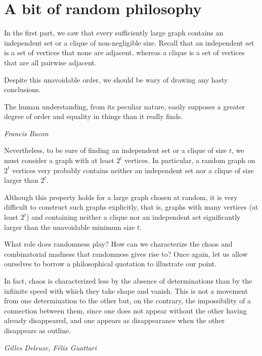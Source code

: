 \documentclass{amsart}
\begin{document}
\section{A bit of random philosophy}
In the first part, we saw that every sufficiently large graph contains
an independent set or a clique of non-negligible size. Recall that an
independent set is a set of vertices that  none are adjacent,
whereas a clique is a set of vertices that are all pairwise adjacent.

Despite this unavoidable order, we should be wary of drawing any hasty
conclusions.

\bigskip\par
\begin{quoting}\sf\noindent
  The human understanding, from its peculiar nature, easily supposes
  a greater degree of order and equality in things than it really
  finds.
  \medskip\par\noindent\it Francis Bacon%
\end{quoting}
\bigskip\par

Nevertheless, to be sure of finding an independent set or a clique of
size $t$, we must consider a graph with at least $2^{t}$ vertices. In
particular, a random graph%
on $2^{t}$ vertices very probably%
contains neither an independent set nor a clique of size larger than
$2^{t}$.

Although this property holds for a large graph chosen at random, it is
very difficult to construct such graphs explicitly, that is, graphs
with many vertices (at least $2^{t}$) and containing neither a clique nor an
independent set significantly larger than the unavoidable minimum size
$t$.

What role does randomness play? How can we characterize the chaos and
combinatorial madness that randomness gives rise to? Once again, let
us allow ourselves to borrow a philosophical quotation to illustrate
our point.

\bigskip\par
\begin{quoting}\sf\noindent
  In fact, chaos is characterized less by the absence of
  determinations than by the infiinite speed with which they take
  shape and vanish. This is not a movement from one determination to
  the other but, on the contrary, the impossibility of a connection
  between them, since one does not appear without the other having
  already disappeared, and one appears as disappearance when the other
  disappears as outline.%
  \medskip\par\noindent\it Gilles Deleuze, F\'elix Guattari%
\end{quoting}
\bigskip\par
\end{document}
